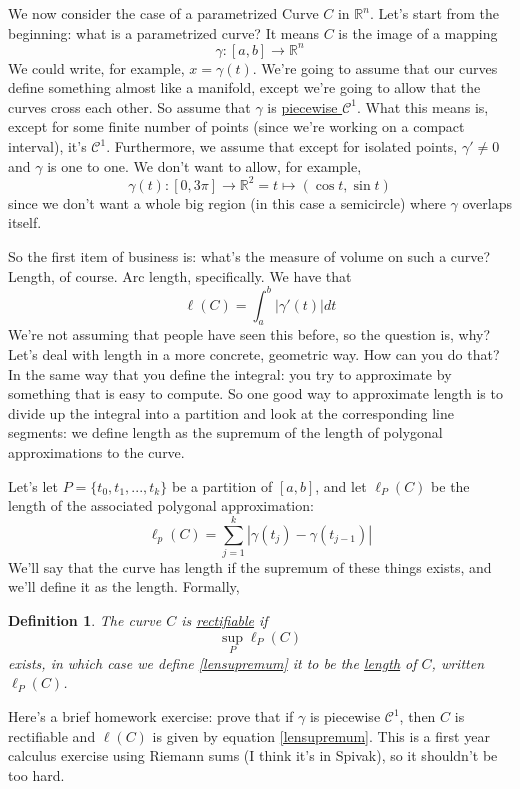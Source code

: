 \documentclass{article}
\newtheorem{definition}{Definition}
\newcommand{\reals}[0]{\mathbb{R}}
\newcommand{\mc}[1]{\mathcal{#1}}
\begin{document}
We now consider the case of a parametrized Curve \(C\) in \(\reals^n\). Let's start from the beginning: what is a parametrized curve? It means \(C\) is the image of a mapping
\begin{equation}
  \gamma : [a, b] \to \reals^n
\end{equation}
We could write, for example, \(x = \gamma(t)\). We're going to assume that our curves define something almost like a manifold, except we're going to allow that the curves cross each other. So assume that \(\gamma\) is \underline{piecewise \(\mc{C}^1\)}. What this means is, except for some finite number of points (since we're working on a compact interval), it's \(\mc{C}^1\). Furthermore, we assume that except for isolated points, \(\gamma' \neq 0\) and \(\gamma\) is one to one.
We don't want to allow, for example,
\begin{equation}
  \gamma(t): [0, 3\pi] \to \reals^2 = t \mapsto (\cos t, \sin t)
\end{equation}
since we don't want a whole big region (in this case a semicircle) where \(\gamma\) overlaps itself.

So the first item of business is: what's the measure of volume on such a curve? Length, of course. Arc length, specifically. We have that
\begin{equation}
  \ell(C) = \int_a^b|\gamma'(t)|dt
\end{equation}
We're not assuming that people have seen this before, so the question is, why? Let's deal with length in a more concrete, geometric way. How can you do that? In the same way that you define the integral: you try to approximate by something that is easy to compute. So one good way to approximate length is to divide up the integral into a partition and look at the corresponding line segments: we define length as the supremum of the length of polygonal approximations to the curve.

Let's let \(P = \{t_0,t_1,...,t_k\}\) be a partition of \([a, b]\), and let \(\ell_P(C)\) be the length of the associated polygonal approximation:
\begin{equation}
  \ell_p(C) = \sum_{j = 1}^k|\gamma(t_j) - \gamma(t_{j - 1})|
\end{equation}
We'll say that the curve has length if the supremum of these things exists, and we'll define it as the length. Formally,
\begin{definition}
  The curve \(C\) is \underline{rectifiable} if
  \begin{equation}
    \sup_P\ell_P(C)
    \label{lensupremum}
  \end{equation}
  exists, in which case we define \ref{lensupremum} it to be the \underline{length} of \(C\), written \(\ell_P(C)\).
\end{definition}
Here's a brief homework exercise: prove that if \(\gamma\) is piecewise \(\mc{C}^1\), then \(C\) is rectifiable and \(\ell(C)\) is given by equation \ref{lensupremum}. This is a first year calculus exercise using Riemann sums (I think it's in Spivak), so it shouldn't be too hard.
\end{document}
